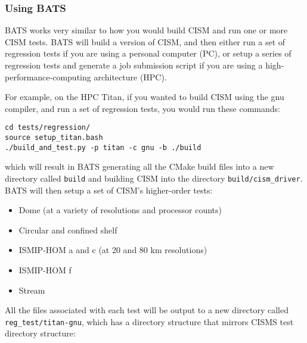 \subsubsection{Using BATS} 

BATS works very similar to how you would build CISM and run one or more CISM tests. BATS will
build a version of CISM, and then either run a set of regression tests if you are using a personal computer (PC), or
setup a series of regression tests and generate a job submission script if you are using a high-performance-computing
architecture (HPC). 

\par
For example, on the HPC Titan, if you wanted to build CISM using the gnu compiler, and run a set of regression tests,
you would run these commands: 

\begin{verbatim}
cd tests/regression/
source setup_titan.bash
./build_and_test.py -p titan -c gnu -b ./build
\end{verbatim}

\noindent
which will result in BATS generating all the CMake build files into a new directory called \texttt{build} and building
CISM into the directory \texttt{build/cism\_driver}. BATS will then setup a set of CISM's higher-order tests:

\begin{itemize}
    \item Dome (at a variety of resolutions and processor counts) \\
    \item Circular and confined shelf \\
    \item ISMIP-HOM a and c (at 20 and 80 km resolutions) \\
    \item ISMIP-HOM f \\
    \item Stream \\
\end{itemize}

\par
All the files associated with each test will be output to a new directory called \texttt{reg\_test/titan-gnu}, which has a
directory structure that mirrors CISMS test directory structure:

